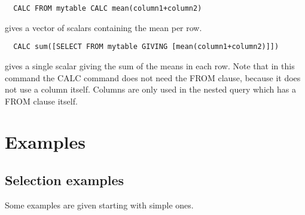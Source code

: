 \begin{verbatim}
  CALC FROM mytable CALC mean(column1+column2)
\end{verbatim}
gives a vector of scalars containing the mean per row.

\begin{verbatim}
  CALC sum([SELECT FROM mytable GIVING [mean(column1+column2)]])
\end{verbatim}
gives a single scalar giving the sum of the means in each row.
Note that in this command the CALC command does not need the FROM
clause, because it does not use a column itself. Columns are only
used in the nested query which has a FROM clause itself.

\section{Examples}
\subsection{\label{TAQL:SELEXAMPLES}Selection examples}
Some examples are given starting with simple ones.
